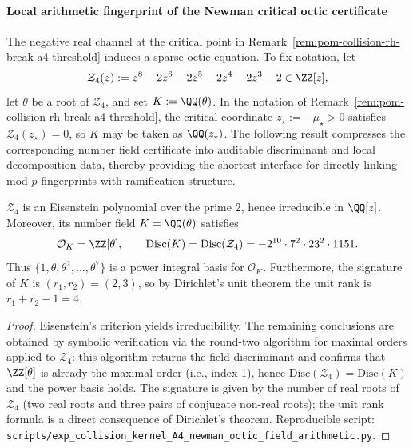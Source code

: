 
\paragraph{Local arithmetic fingerprint of the Newman critical octic certificate}
The negative real channel at the critical point in Remark~\ref{rem:pom-collision-rh-break-a4-threshold} induces a sparse octic equation.
To fix notation, let
\[
\mathcal Z_4(z):=z^8-2z^6-2z^5-2z^4-2z^3-2\in\ZZ[z],
\]
let \(\theta\) be a root of \(\mathcal Z_4\), and set
\(
K:=\QQ(\theta)
\).
In the notation of Remark~\ref{rem:pom-collision-rh-break-a4-threshold}, the critical coordinate \(z_\star:=-\mu_\star>0\) satisfies \(\mathcal Z_4(z_\star)=0\), so \(K\) may be taken as \(\QQ(z_\star)\).
The following result compresses the corresponding number field certificate into auditable discriminant and local decomposition data, thereby providing the shortest interface for directly linking mod-\(p\) fingerprints with ramification structure.

\begin{proposition}\label{prop:pom-a4t-newman-octic-field-basic}
\(\mathcal Z_4\) is an Eisenstein polynomial over the prime \(2\), hence irreducible in \(\QQ[z]\).
Moreover, its number field \(K=\QQ(\theta)\) satisfies
\[
\mathcal O_K=\ZZ[\theta],
\qquad
\mathrm{Disc}(K)=\mathrm{Disc}(\mathcal Z_4)=-2^{10}\cdot 7^2\cdot 23^2\cdot 1151.
\]
Thus \(\{1,\theta,\theta^2,\dots,\theta^7\}\) is a power integral basis for \(\mathcal O_K\).
Furthermore, the signature of \(K\) is \((r_1,r_2)=(2,3)\), so by Dirichlet's unit theorem the unit rank is \(r_1+r_2-1=4\).
\end{proposition}
\begin{proof}
Eisenstein's criterion yields irreducibility.
The remaining conclusions are obtained by symbolic verification via the round-two algorithm for maximal orders applied to \(\mathcal Z_4\): this algorithm returns the field discriminant and confirms that \(\ZZ[\theta]\) is already the maximal order (i.e., index 1), hence \(\mathrm{Disc}(\mathcal Z_4)=\mathrm{Disc}(K)\) and the power basis holds.
The signature is given by the number of real roots of \(\mathcal Z_4\) (two real roots and three pairs of conjugate non-real roots); the unit rank formula is a direct consequence of Dirichlet's theorem.
Reproducible script: \texttt{scripts/exp\_collision\_kernel\_A4\_newman\_octic\_field\_arithmetic.py}.
\end{proof}

